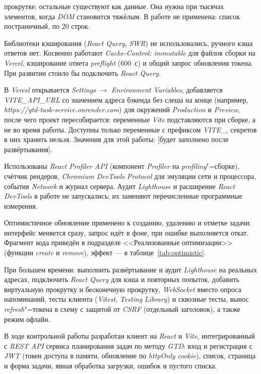 \documentclass{stp}
\newcommand{\en}[1]{\textit{#1}}
\begin{document}
\begin{stpnum}
    прокрутке; остальные существуют как данные. Она нужна при тысячах
    элементов, когда \en{DOM} становится тяжёлым. В работе не применена:
    список постраничный, по 20 строк.
  \item Библиотеки кэширования (\en{React Query}, \en{SWR}) не
    использовались, ручного кэша ответов нет. Косвенно работают
    \en{Cache-Control: immutable} для файлов сборки на \en{Vercel},
    кэширование ответа \en{preflight} (600~с) и общий запрос обновления
    токена. При развитии стоило бы подключить \en{React Query}.
  \item В \en{Vercel} открывается \en{Settings} $\to$ \en{Environment
    Variables}, добавляется \en{VITE\_API\_URL} со значением адреса
    бэкенда без слеша на конце (например,
    \en{https://gtd-task-service.onrender.com}) для окружений
    \en{Production} и \en{Preview}, после чего проект пересобирается:
    переменные \en{Vite} подставляются при сборке, а не во время работы.
    Доступны только переменные с префиксом \en{VITE\_}, секретов в них
    хранить нельзя. Значения для этой работы: [будет заполнено после
    развёртывания].
  \item Использованы \en{React Profiler API} (компонент \en{Profiler} на
    \en{profiling}"=сборке), счётчик рендеров, \en{Chromium DevTools
    Protocol} для эмуляции сети и процессора, события \en{Network} и
    журнал сервера. Аудит \en{Lighthouse} и расширение \en{React
    DevTools} в работе не запускались; их заменяют перечисленные
    программные измерения.
  \item Оптимистичное обновление применено к созданию, удалению и
    отметке задачи: интерфейс меняется сразу, запрос идёт в фоне, при
    ошибке выполняется откат. Фрагмент кода приведён в подразделе
    <<Реализованные оптимизации>> (функции \en{create} и \en{remove}),
    эффект --- в таблице~\ref{tab:optimistic}.
  \item При большем времени: выполнить развёртывание и аудит
    \en{Lighthouse} на реальных адресах, подключить \en{React Query}
    для кэша и повторных попыток, добавить виртуальную прокрутку и
    бесконечную прокрутку, \en{WebSocket} вместо опроса напоминаний,
    тесты клиента (\en{Vitest}, \en{Testing Library}) и сквозные тесты,
    вынос \en{refresh}"=токена в схему с защитой от \en{CSRF}
    (отдельный заголовок), а также режим офлайн.
\end{stpnum}


В ходе контрольной работы разработан клиент на \en{React} и \en{Vite},
интегрированный с \en{REST API} сервиса планирования задач по методу
\en{GTD}: вход и регистрация с \en{JWT} (токен доступа в памяти, обновление
по \en{httpOnly cookie}), список, страница и форма задачи, явная обработка
загрузки, ошибок и пустого списка.
\end{document}
